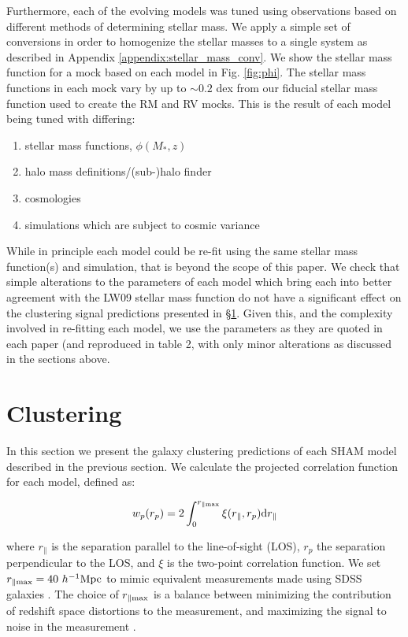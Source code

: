 \documentclass[a4paper,fleqn,usenatbib]{mnras}
\begin{document}
Furthermore, each of the evolving models was tuned using observations based on different methods of determining stellar mass.  We apply a simple set of conversions in order to homogenize the stellar masses to a single system as described in Appendix \ref{appendix:stellar_mass_conv}.   We show the stellar mass function for a mock based on each model in Fig. \ref{fig:phi}.  The stellar mass functions in each mock vary by up to $\sim 0.2$ dex from our fiducial stellar mass function used to create the RM and RV mocks.  This is the result of each model being tuned with differing:
\begin{enumerate}
\item stellar mass functions, $\phi(M_*,z)$
\item halo mass definitions/(sub-)halo finder
\item cosmologies
\item simulations which are subject to cosmic variance
\end{enumerate}
While in principle each model could be re-fit using the same stellar mass function(s) and simulation, that is beyond the scope of this paper.  We check that simple alterations to the parameters of each model which bring each into better agreement with the LW09 stellar mass function do not have a significant effect on the clustering signal predictions presented in \S \ref{sec:clustering}.  Given this, and the complexity involved in re-fitting each model, we use the parameters as they are quoted in each paper (and reproduced in table 2, with only minor alterations as discussed in the sections above.  


\section{Clustering}
\label{sec:clustering}

In this section we present the galaxy clustering predictions of each SHAM model described in the previous section.  We calculate the projected correlation function for each model, defined as:
%
\begin{linenomath}
\begin{equation}
w_p(r_p) = 2\int_0^{r_{\parallel \rm max}}\xi(r_{\parallel},r_p)\mathrm{d}r_{\parallel}
\end{equation}
\end{linenomath}
%
where $r_{\parallel}$ is the separation parallel to the line-of-sight (LOS), $r_{p}$ the separation perpendicular to the LOS, and $\xi$ is the two-point correlation function.  We set $r_{\parallel \rm max} = 40~{h^{-1}\rm Mpc}$ to mimic equivalent measurements made using SDSS galaxies \citep{Yang:2012ew}.  The choice of $r_{\parallel \rm max}$ is a balance between minimizing the contribution of redshift space distortions to the measurement, and maximizing the signal to noise in the measurement \citep{Padmanabhan:2007kn, vandenBosch:2013jf}.
\end{document}

